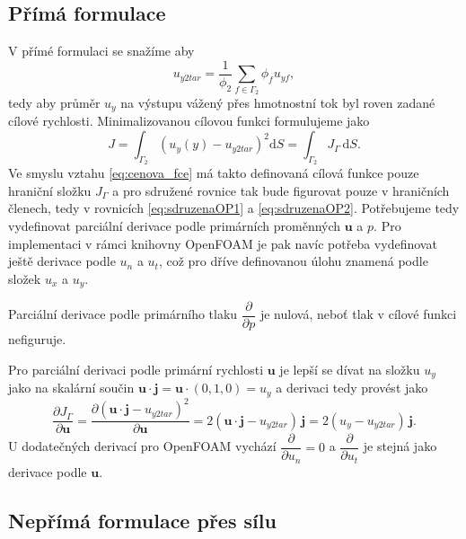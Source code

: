 \subsection{Přímá formulace}

V přímé formulaci se snažíme aby
\begin{equation}
	u_{y2tar}=\dfrac{1}{\phi_2}\sum_{f\in\Gamma_2}\phi_f u_{yf},
\end{equation}
tedy aby průměr $ u_y $ na výstupu vážený přes hmotnostní tok byl roven zadané cílové rychlosti.
Minimalizovanou cílovou funkci formulujeme jako
\begin{equation}\label{eq:J_UyTarget}
	J = \int_{\Gamma_2}\left( u_y(y)-u_{y2tar} \right)^2\mathrm{d}S = \int_{\Gamma_2} J_\Gamma\, \mathrm{d}S.
\end{equation}
Ve smyslu vztahu \ref{eq:cenova_fce} má takto definovaná cílová funkce pouze hraniční složku $ J_\Gamma $ a pro sdružené rovnice tak bude figurovat pouze v hraničních členech, tedy v rovnicích \ref{eq:sdruzenaOP1} a \ref{eq:sdruzenaOP2}. Potřebujeme tedy vydefinovat parciální derivace podle primárních proměnných $ \mathbf{u} $ a $ p $. Pro implementaci v rámci knihovny OpenFOAM je pak navíc potřeba vydefinovat ještě derivace podle $ u_n $ a $ u_t $, což pro dříve definovanou úlohu znamená podle složek $ u_x $ a $ u_y $.

Parciální derivace podle primárního tlaku $ \dfrac{\partial}{\partial p} $ je nulová, neboť tlak v cílové funkci nefiguruje.

Pro parciální derivaci podle primární rychlosti $ \mathbf{u} $ je lepší se dívat na složku $ u_y $ jako na skalární součin $ \mathbf{u}\cdot \mathbf{j}=\mathbf{u}\cdot (0,1,0) = u_y$ a derivaci tedy provést jako
\begin{equation}\label{key}
\dfrac{\partial J_\Gamma}{\partial \mathbf{u}}
=
\dfrac{\partial \left( \mathbf{u}\cdot \mathbf{j}-u_{y2tar} \right)^2}{\partial \mathbf{u}}
=
2( \mathbf{u}\cdot \mathbf{j}-u_{y2tar} )\,\mathbf{j}
=
2( u_y-u_{y2tar} )\,\mathbf{j}.
\end{equation}
U dodatečných derivací pro OpenFOAM vychází $ \dfrac{\partial}{\partial u_n}=0 $ a $ \dfrac{\partial }{\partial u_t} $ je stejná jako derivace podle $ \mathbf{u} $.

\subsection{Nepřímá formulace přes sílu}

